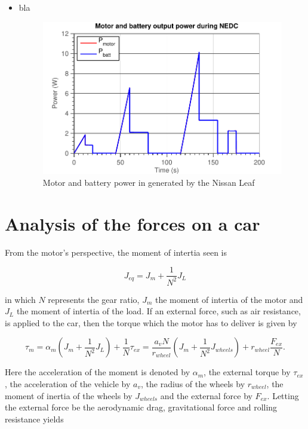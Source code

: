 \documentclass[11pt,titlepage]{report}
\begin{document}
\begin{enumerate}
\begin{itemize}
		\item
		bla

		\begin{figure}[H]
			\begin{center}
				\includegraphics[width=0.6\linewidth]{resource/kitt/motor-bat-power-rc.pdf}
			\end{center}
			\caption{Motor and battery power in generated by the Nissan Leaf}
			\label{fig:ass4-t1-motor-bat-power-kitt}
		\end{figure}
	\end{itemize}
\end{enumerate}

\section{Analysis of the forces on a car}
From the motor's perspective, the moment of intertia seen is

\begin{equation}
	J_{eq} = J_m + \frac{1}{N^2} J_L
\end{equation}

in which $N$ represents the gear ratio, $J_m$ the moment of intertia of the motor and $J_L$ the moment of intertia of the load. If an external force, such as air resistance, is applied to the car, then the torque which the motor has to deliver is given by

\begin{equation} \label{eq:ass-4-eq-torque}
	\tau_{m} = \alpha_m (J_m + \frac{1}{N^2} J_L) + \frac{1}{N} \tau_{ex} =
	\frac{a_v N}{r_{wheel}} (J_m + \frac{1}{N^2} J_{wheels}) + r_{wheel} \frac{F_{ex}}{N}.
\end{equation}

Here the acceleration of the moment is denoted by $\alpha_m$, the external torque by $\tau_{ex}$, the acceleration of the vehicle by $a_v$, the radius of the wheels by $r_{wheel}$, the moment of inertia of the wheels by $J_{wheels}$ and the external force by $F_{ex}$. Letting the external force be the aerodynamic drag, gravitational force and rolling resistance yields
\end{document}
